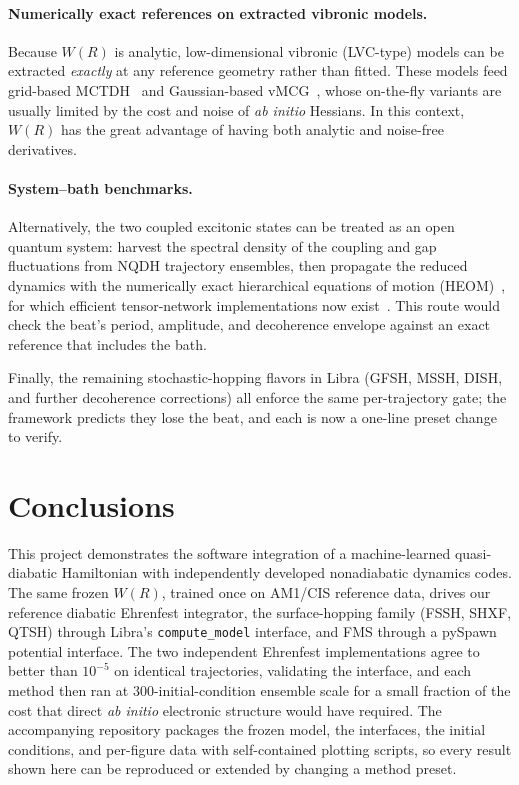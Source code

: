 \documentclass[11pt]{article}
\begin{document}
\paragraph{Numerically exact references on extracted vibronic models.}
Because $W(R)$ is analytic, low-dimensional vibronic (LVC-type) models can be extracted \emph{exactly} at any reference geometry rather than fitted. These models feed grid-based MCTDH~\cite{beck2000multiconfiguration} and Gaussian-based vMCG~\cite{richings2015quantum}, whose on-the-fly variants are usually limited by the cost and noise of \emph{ab initio} Hessians. In this context, $W(R)$ has the great advantage of having both analytic and noise-free derivatives. 

\paragraph{System--bath benchmarks.}
Alternatively, the two coupled excitonic states can be treated as an open quantum system: harvest the spectral density of the coupling and gap fluctuations from NQDH trajectory ensembles, then propagate the reduced dynamics with the numerically exact hierarchical equations of motion (HEOM)~\cite{tanimura2020numerically}, for which efficient tensor-network implementations now exist~\cite{rodriguez2026tenso}. This route would check the beat's period, amplitude, and decoherence envelope against an exact reference that includes the bath.

Finally, the remaining stochastic-hopping flavors in Libra (GFSH, MSSH, DISH, and further decoherence corrections) all enforce the same per-trajectory gate; the framework predicts they lose the beat, and each is now a one-line preset change to verify.

\section{Conclusions}
This project demonstrates the software integration of a machine-learned quasi-diabatic Hamiltonian with independently developed nonadiabatic dynamics codes. The same frozen $W(R)$, trained once on AM1/CIS reference data, drives our reference diabatic Ehrenfest integrator, the surface-hopping family (FSSH, SHXF, QTSH) through Libra's \texttt{compute\_model} interface, and FMS through a pySpawn potential interface. The two independent Ehrenfest implementations agree to better than $10^{-5}$ on identical trajectories, validating the interface, and each method then ran at $300$-initial-condition ensemble scale for a small fraction of the cost that direct \textit{ab initio} electronic structure would have required. The accompanying repository packages the frozen model, the interfaces, the initial conditions, and per-figure data with self-contained plotting scripts, so every result shown here can be reproduced or extended by changing a method preset.
\end{document}
